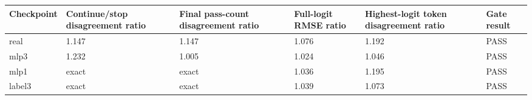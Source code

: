 \begin{tabular}{llllll}
\toprule
Checkpoint & Continue/stop disagreement ratio & Final pass-count disagreement ratio & Full-logit RMSE ratio & Highest-logit token disagreement ratio & Gate result \\
\midrule
real & 1.147 & 1.147 & 1.076 & 1.192 & PASS \\
mlp3 & 1.232 & 1.005 & 1.024 & 1.046 & PASS \\
mlp1 & exact & exact & 1.036 & 1.195 & PASS \\
label3 & exact & exact & 1.039 & 1.073 & PASS \\
\bottomrule
\end{tabular}
